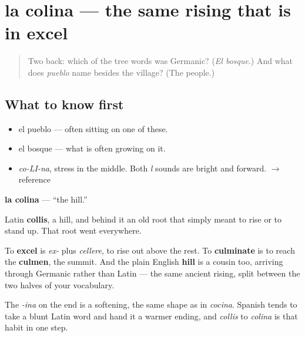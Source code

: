 \section[la colina]{la colina — the same rising that is in excel}

\label{lesson:ES-C292-colina}



\begin{quote}
Two back: which of the tree words was Germanic? (\emph{El bosque}.) And what does \emph{pueblo} name besides the village? (The people.)
\end{quote}

\subsection*{What to know first}
\begin{itemize}
\raggedright
  \item el pueblo — often sitting on one of these.
  \item el bosque — what is often growing on it.
\end{itemize}

\begin{sounds}
\begin{itemize}
\raggedright
  \item \emph{co-LI-na}, stress in the middle. Both \emph{l} sounds are bright and forward. $\to$ reference
\end{itemize}
\end{sounds}

\begin{cousinweb}
\textbf{la colina} — \textquotedblleft{}the hill.\textquotedblright{}

Latin \textbf{collis}, a hill, and behind it an old root that simply meant to rise or to stand up. That root went everywhere.

To \textbf{excel} is \emph{ex-} plus \emph{cellere}, to rise out above the rest. To \textbf{culminate} is to reach the \textbf{culmen}, the summit. And the plain English \textbf{hill} is a cousin too, arriving through Germanic rather than Latin — the same ancient rising, split between the two halves of your vocabulary.

The \emph{-ina} on the end is a softening, the same shape as in \emph{cocina}. Spanish tends to take a blunt Latin word and hand it a warmer ending, and \emph{collis} to \emph{colina} is that habit in one step.
\end{cousinweb}

